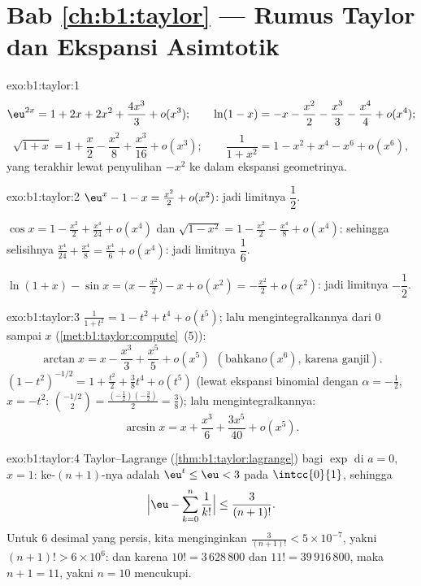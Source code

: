 \section*{Bab \ref{ch:b1:taylor} --- Rumus Taylor dan Ekspansi
Asimtotik}

\begin{solution}{exo:b1:taylor:1}
\[
\eu^{2x} = 1 + 2x + 2x^2 + \frac{4x^3}{3} + o(x^3);
\qquad
\ln(1 - x) = -x - \frac{x^2}{2} - \frac{x^3}{3} - \frac{x^4}{4} +
o(x^4);
\]
\[
\sqrt{1+x} = 1 + \frac x2 - \frac{x^2}{8} + \frac{x^3}{16} + o(x^3);
\qquad
\frac{1}{1 + x^2} = 1 - x^2 + x^4 - x^6 + o(x^6),
\]
yang terakhir lewat penyulihan $-x^2$ ke dalam ekspansi geometrinya.
\end{solution}

\begin{solution}{exo:b1:taylor:2}
$\eu^x - 1 - x = \frac{x^2}{2} + o(x^2)$: jadi limitnya $\dfrac12$.

$\cos x = 1 - \frac{x^2}{2} + \frac{x^4}{24} + o(x^4)$ dan
$\sqrt{1 - x^2} = 1 - \frac{x^2}{2} - \frac{x^4}{8} + o(x^4)$:
sehingga selisihnya $\frac{x^4}{24} + \frac{x^4}{8} = \frac{x^4}{6} + o(x^4)$:
jadi limitnya $\dfrac16$.

$\ln(1+x) - \sin x = \bigl(x - \frac{x^2}{2}\bigr) - x + o(x^2) =
-\frac{x^2}{2} + o(x^2)$: jadi limitnya $-\dfrac12$.
\end{solution}

\begin{solution}{exo:b1:taylor:3}
$\frac{1}{1+t^2} = 1 - t^2 + t^4 + o(t^5)$; lalu mengintegralkannya dari $0$ sampai
$x$ (\cref{met:b1:taylor:compute}~(5)):
\[
\arctan x = x - \frac{x^3}{3} + \frac{x^5}{5} + o(x^5)\ \ (\text{bahkan
}o(x^6)\text{, karena ganjil}).
\]
$(1 - t^2)^{-1/2} = 1 + \frac{t^2}{2} + \frac38 t^4 + o(t^5)$ (lewat ekspansi
binomial dengan $\alpha = -\frac12$, $x = -t^2$:
$\binom{-1/2}{2} = \frac{(-\frac12)(-\frac32)}{2} = \frac38$);
lalu mengintegralkannya:
\[
\arcsin x = x + \frac{x^3}{6} + \frac{3x^5}{40} + o(x^5) .
\]
\end{solution}

\begin{solution}{exo:b1:taylor:4}
Taylor--Lagrange (\cref{thm:b1:taylor:lagrange}) bagi $\exp$ di $a =
0$, $x = 1$:  ke-$(n+1)$-nya adalah $\eu^t \leq \eu < 3$ pada
$\intcc{0}{1}$, sehingga
\[
\Bigl|\eu - \sum_{k=0}^{n} \frac{1}{k!}\Bigr| \leq
\frac{3}{(n+1)!} .
\]
Untuk $6$ desimal yang persis, kita menginginkan $\frac{3}{(n+1)!} < 5\times 10^{-7}$,
yakni $(n+1)! > 6\times 10^{6}$: dan karena $10! = 3\,628\,800$ dan $11! =
39\,916\,800$, maka $n + 1 = 11$, yakni $n = 10$ mencukupi.
\end{solution}

